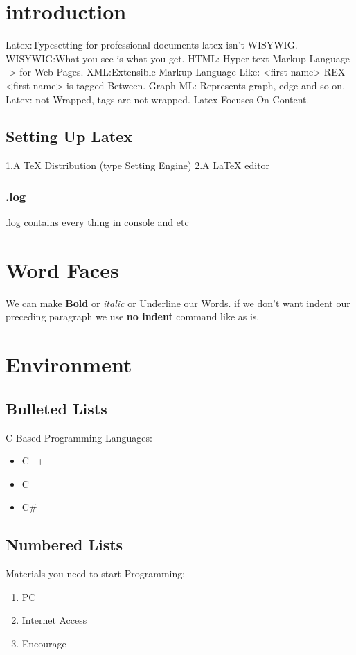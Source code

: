 \documentclass{article}
\title{}
\author{}
\date{}
\begin{document}
	\maketitle
	\section {introduction}
		Latex:Typesetting for professional documents latex isn't WISYWIG.
		WISYWIG:What you see is what you get.
		HTML: Hyper text Markup Language -> for Web Pages.
		XML:Extensible Markup Language Like: <first name> REX <first name> is tagged Between.
		Graph ML: Represents graph, edge and so on.
		Latex: not Wrapped, tags are not wrapped.
		Latex Focuses On Content.
		\subsection{Setting Up Latex}
			1.A TeX Distribution (type Setting Engine)
			2.A LaTeX editor
			\subsubsection{.log}
				.log contains every thing in console and etc
	\section{Word Faces}
		We can make \textbf{Bold} or \emph{italic} or \underline{Underline} our Words.
		if we don't want indent our preceding paragraph we use \textbf{no indent} command like as is. \noindent{}
	\section{Environment}
		\subsection{Bulleted Lists}
			C Based Programming Languages:
			\begin{itemize}
				\item C++
				\item C
				\item C\#%
			\end{itemize}
		\subsection{Numbered Lists}
			Materials you need to start Programming:
			\begin{enumerate}
				\item PC
				\item Internet Access
				\item Encourage
			\end{enumerate}
\end{document}
